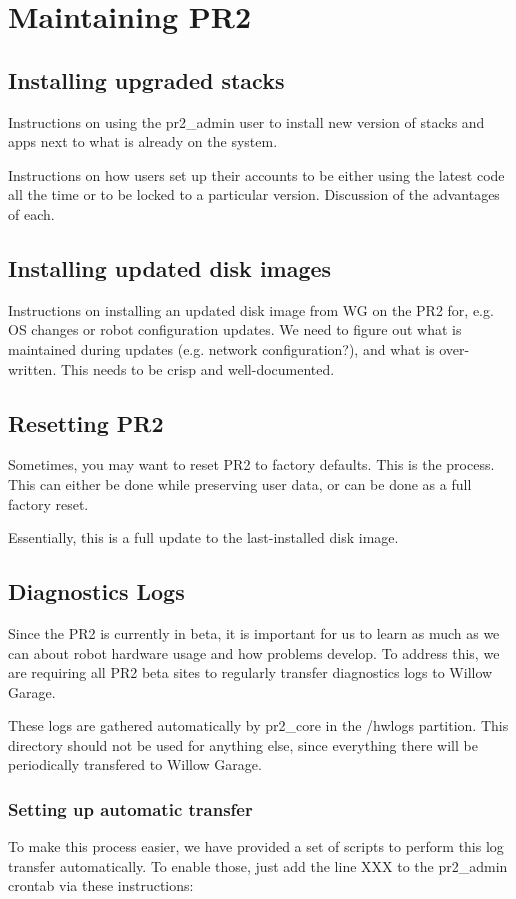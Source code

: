 \chapter{Maintaining PR2}
\section{Installing upgraded stacks}
Instructions on using the pr2\_admin user to install new version of stacks and apps next to what is already on the system.

Instructions on how users set up their accounts to be either using the latest code all the time or to be locked to a particular version.  Discussion of the advantages of each.
\section{Installing updated disk images}
Instructions on installing an updated disk image from WG on the PR2 for, e.g. OS changes or robot configuration updates.  We need to figure out what is maintained during updates (e.g. network configuration?), and what is over-written.  This needs to be crisp and well-documented.
\section{Resetting PR2}
Sometimes, you may want to reset PR2 to factory defaults.  This is the process.
This can either be done while preserving user data, or can be done as a full factory reset.

Essentially, this is a full update to the last-installed disk image.
\section{Diagnostics Logs}
Since the PR2 is currently in beta, it is important for us to learn as much as we can about robot hardware usage and how problems develop.  To address this, we are requiring all PR2 beta sites to regularly transfer diagnostics logs to Willow Garage.

These logs are gathered automatically by pr2\_core in the /hwlogs partition.  This directory should not be used for anything else, since everything there will be periodically transfered to Willow Garage.
\subsection{Setting up automatic transfer}
To make this process easier, we have provided a set of scripts to perform this log transfer automatically.  To enable those, just add the line XXX to the pr2\_admin crontab via these instructions:
